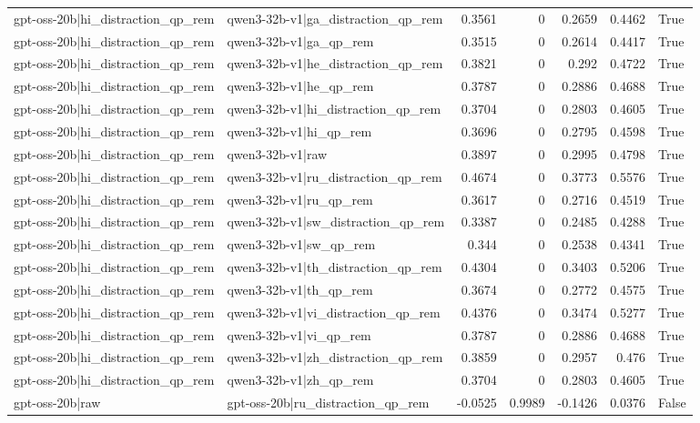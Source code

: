 \begin{table}
\begin{tabular}{l l r r r r l}
gpt-oss-20b|hi_distraction_qp_rem & qwen3-32b-v1|ga_distraction_qp_rem & 0.3561 & 0 & 0.2659 & 0.4462 & True \\
gpt-oss-20b|hi_distraction_qp_rem & qwen3-32b-v1|ga_qp_rem & 0.3515 & 0 & 0.2614 & 0.4417 & True \\
gpt-oss-20b|hi_distraction_qp_rem & qwen3-32b-v1|he_distraction_qp_rem & 0.3821 & 0 & 0.292 & 0.4722 & True \\
gpt-oss-20b|hi_distraction_qp_rem & qwen3-32b-v1|he_qp_rem & 0.3787 & 0 & 0.2886 & 0.4688 & True \\
gpt-oss-20b|hi_distraction_qp_rem & qwen3-32b-v1|hi_distraction_qp_rem & 0.3704 & 0 & 0.2803 & 0.4605 & True \\
gpt-oss-20b|hi_distraction_qp_rem & qwen3-32b-v1|hi_qp_rem & 0.3696 & 0 & 0.2795 & 0.4598 & True \\
gpt-oss-20b|hi_distraction_qp_rem & qwen3-32b-v1|raw & 0.3897 & 0 & 0.2995 & 0.4798 & True \\
gpt-oss-20b|hi_distraction_qp_rem & qwen3-32b-v1|ru_distraction_qp_rem & 0.4674 & 0 & 0.3773 & 0.5576 & True \\
gpt-oss-20b|hi_distraction_qp_rem & qwen3-32b-v1|ru_qp_rem & 0.3617 & 0 & 0.2716 & 0.4519 & True \\
gpt-oss-20b|hi_distraction_qp_rem & qwen3-32b-v1|sw_distraction_qp_rem & 0.3387 & 0 & 0.2485 & 0.4288 & True \\
gpt-oss-20b|hi_distraction_qp_rem & qwen3-32b-v1|sw_qp_rem & 0.344 & 0 & 0.2538 & 0.4341 & True \\
gpt-oss-20b|hi_distraction_qp_rem & qwen3-32b-v1|th_distraction_qp_rem & 0.4304 & 0 & 0.3403 & 0.5206 & True \\
gpt-oss-20b|hi_distraction_qp_rem & qwen3-32b-v1|th_qp_rem & 0.3674 & 0 & 0.2772 & 0.4575 & True \\
gpt-oss-20b|hi_distraction_qp_rem & qwen3-32b-v1|vi_distraction_qp_rem & 0.4376 & 0 & 0.3474 & 0.5277 & True \\
gpt-oss-20b|hi_distraction_qp_rem & qwen3-32b-v1|vi_qp_rem & 0.3787 & 0 & 0.2886 & 0.4688 & True \\
gpt-oss-20b|hi_distraction_qp_rem & qwen3-32b-v1|zh_distraction_qp_rem & 0.3859 & 0 & 0.2957 & 0.476 & True \\
gpt-oss-20b|hi_distraction_qp_rem & qwen3-32b-v1|zh_qp_rem & 0.3704 & 0 & 0.2803 & 0.4605 & True \\
gpt-oss-20b|raw & gpt-oss-20b|ru_distraction_qp_rem & -0.0525 & 0.9989 & -0.1426 & 0.0376 & False \\

\end{tabular}
\end{table}
